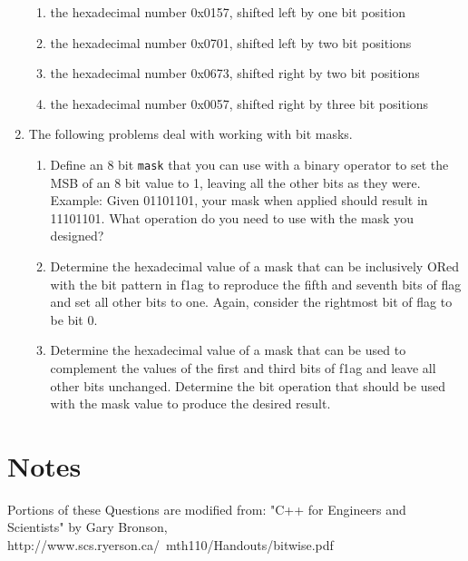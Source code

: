 \begin{enumerate}
\begin{enumerate}
\item the hexadecimal number 0x0157, shifted left by one bit position

\item the hexadecimal number 0x0701, shifted left by two bit positions

\item the hexadecimal number 0x0673, shifted right by two bit positions

\item the hexadecimal number 0x0057, shifted right by three bit positions
\end{enumerate}

\item The following problems deal with working with bit masks.
\begin{enumerate}
    
\item Define an 8 bit \texttt{mask} that you can use with a binary operator to set the MSB of an 8 bit value to 1, leaving all the other bits as they were. Example: Given 01101101, your mask when applied should result in 11101101. What operation do you need to use with the mask you designed?

\item Determine the hexadecimal value of a mask that can be inclusively ORed with the bit pattern in f1ag to reproduce the fifth and seventh bits of flag and set all other bits to one. Again, consider the rightmost bit of flag to be bit 0.

\item Determine the hexadecimal value of a mask that can be used to complement the values of the first and third bits of f1ag and leave all other bits unchanged. Determine the bit operation that should be used with the mask value to produce the desired result.
    \end{enumerate}
\end{enumerate}

    \section*{Notes}
    Portions of these Questions are modified from: "C++ for Engineers and Scientists" by Gary Bronson, http://www.scs.ryerson.ca/~mth110/Handouts/bitwise.pdf

